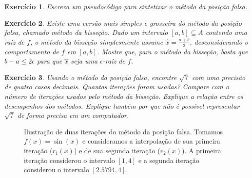 \documentclass[]{article}
\newtheorem{exercicio}{Exercício}
\numberwithin{equation}{section}
\begin{document}
\begin{exercicio}
  Escreva um pseudocódigo para sintetizar o método da posição falsa.
\end{exercicio}

\begin{exercicio}
  Existe uma versão mais simples e grosseira do método da posição
  falsa, chamado método da bisseção. Dado um intervalo
  $[a, b] \subseteq A$ contendo uma raiz de $f$, o método da bisseção
  simplesmente assume $\hat{x} = \frac{a + b}{2}$, desconsiderando o
  comportamento de $f$ em $[a, b]$. Mostre que, para o método da
  bisseção, basta que $b - a \leq 2\epsilon$ para que $\hat{x}$ seja
  uma $\epsilon$-raiz de $f$.
\end{exercicio}

\begin{exercicio}
  Usando o método da posição falsa, encontre $\sqrt{7}$ com uma
  precisão de quatro casas decimais. Quantas iterações foram usadas?
  Compare com o número de iterações usados pelo método da
  bisseção. Explique a relação entre os desempenhos dos
  métodos. Explique também por que não é possível representar
  $\sqrt{7}$ de forma precisa em um computador.
\end{exercicio}

\begin{figure}
  \centering
  \caption{Ilustração de duas iterações do método da posição falsa.
    Tomamos $f(x) = \sin(x)$ e consideramos a interpolação de sua
    primeira iteração ($r_1(x)$) e de sua segunda iteração ($r_2(x)$).
    A primeira iteração considerou o intervalo $[1, 4]$ e a segunda
    iteração considerou o intervalo $[2.5794, 4]$.}
\end{figure}
\end{document}
